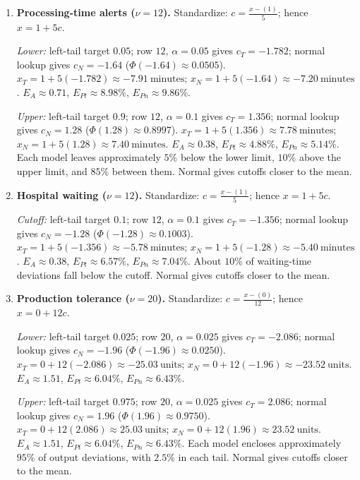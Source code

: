\begin{enumerate}[leftmargin=*,label=\textbf{\arabic*.},itemsep=5pt,parsep=1pt,topsep=3pt]
		\item \textbf{Processing-time alerts ($\nu=12$).} Standardize: $c=\frac{x-(1)}{5}$; hence $x=1+5c$.\par\textit{Lower:} left-tail target $0.05$; row $12$, $\alpha=0.05$ gives $c_T=-1.782$; normal lookup gives $c_N=-1.64$ ($\Phi(-1.64)\approx0.0505$). $x_T=1+5(-1.782)\approx\boxed{-7.91\ \text{minutes}}$; $x_N=1+5(-1.64)\approx\boxed{-7.20\ \text{minutes}}$. $E_A\approx0.71$, $E_{Pt}\approx8.98\%$, $E_{Pn}\approx9.86\%$.\par\textit{Upper:} left-tail target $0.9$; row $12$, $\alpha=0.1$ gives $c_T=1.356$; normal lookup gives $c_N=1.28$ ($\Phi(1.28)\approx0.8997$). $x_T=1+5(1.356)\approx\boxed{7.78\ \text{minutes}}$; $x_N=1+5(1.28)\approx\boxed{7.40\ \text{minutes}}$. $E_A\approx0.38$, $E_{Pt}\approx4.88\%$, $E_{Pn}\approx5.14\%$. Each model leaves approximately $5\%$ below the lower limit, $10\%$ above the upper limit, and $85\%$ between them. Normal gives cutoffs closer to the mean.
		\item \textbf{Hospital waiting ($\nu=12$).} Standardize: $c=\frac{x-(1)}{5}$; hence $x=1+5c$.\par\textit{Cutoff:} left-tail target $0.1$; row $12$, $\alpha=0.1$ gives $c_T=-1.356$; normal lookup gives $c_N=-1.28$ ($\Phi(-1.28)\approx0.1003$). $x_T=1+5(-1.356)\approx\boxed{-5.78\ \text{minutes}}$; $x_N=1+5(-1.28)\approx\boxed{-5.40\ \text{minutes}}$. $E_A\approx0.38$, $E_{Pt}\approx6.57\%$, $E_{Pn}\approx7.04\%$. About $10\%$ of waiting-time deviations fall below the cutoff. Normal gives cutoffs closer to the mean.
		\item \textbf{Production tolerance ($\nu=20$).} Standardize: $c=\frac{x-(0)}{12}$; hence $x=0+12c$.\par\textit{Lower:} left-tail target $0.025$; row $20$, $\alpha=0.025$ gives $c_T=-2.086$; normal lookup gives $c_N=-1.96$ ($\Phi(-1.96)\approx0.0250$). $x_T=0+12(-2.086)\approx\boxed{-25.03\ \text{units}}$; $x_N=0+12(-1.96)\approx\boxed{-23.52\ \text{units}}$. $E_A\approx1.51$, $E_{Pt}\approx6.04\%$, $E_{Pn}\approx6.43\%$.\par\textit{Upper:} left-tail target $0.975$; row $20$, $\alpha=0.025$ gives $c_T=2.086$; normal lookup gives $c_N=1.96$ ($\Phi(1.96)\approx0.9750$). $x_T=0+12(2.086)\approx\boxed{25.03\ \text{units}}$; $x_N=0+12(1.96)\approx\boxed{23.52\ \text{units}}$. $E_A\approx1.51$, $E_{Pt}\approx6.04\%$, $E_{Pn}\approx6.43\%$. Each model encloses approximately $95\%$ of output deviations, with $2.5\%$ in each tail. Normal gives cutoffs closer to the mean.

\end{enumerate}
